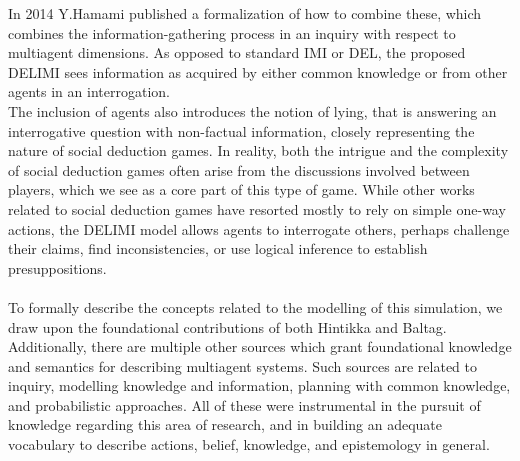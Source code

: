 In 2014 Y.Hamami\cite{delimi} published a formalization of how to combine
these, which combines the information-gathering process in an inquiry with
respect to multiagent dimensions. As opposed to standard IMI or DEL, the
proposed DELIMI sees information as acquired by either common knowledge or from
other agents in an interrogation. \\ The inclusion of agents also introduces
the notion of lying, that is answering an interrogative question with
non-factual information, closely representing the nature of social deduction
games. In reality, both the intrigue and the complexity of social deduction
games often arise from the discussions involved between players, which we see
as a core part of this type of game. While other works related to social
deduction games have resorted mostly to rely on simple one-way actions, the
DELIMI model allows agents to interrogate others, perhaps challenge their
claims, find inconsistencies, or use logical inference to establish
presuppositions.\\ \\ To formally describe the concepts related to the
modelling of this simulation, we draw upon the foundational contributions of
both Hintikka\cite{hintikka} and Baltag\cite{Baltag}. Additionally, there are
multiple other sources which grant foundational knowledge and semantics for
describing multiagent systems. Such sources are related to
inquiry\cite{delimi}, modelling knowledge and
information\cite{modelling_multi_agent_epistemic_systems}, planning with common
knowledge\cite{multi_agent_epistemic_planner_common_knowledge}, and
probabilistic approaches\cite{probibalistic_multiagent_systems}. All of these
were instrumental in the pursuit of knowledge regarding this area of research,
and in building an adequate vocabulary to describe actions, belief, knowledge,
and epistemology in general.